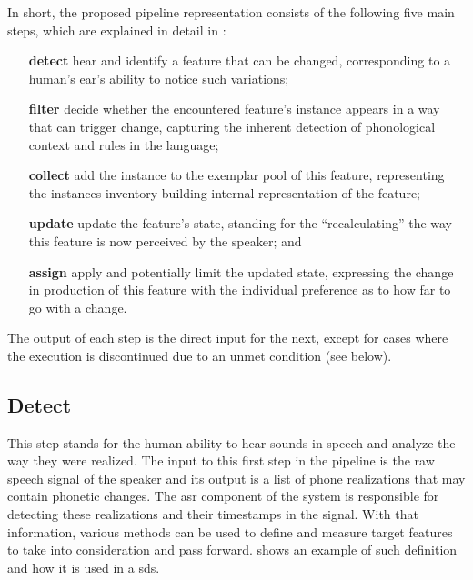 In short, the proposed pipeline representation consists of the following five main steps, which are explained in detail in :
%
\begin{itemize}[topsep=0cm, itemsep=-.1cm, wide=0cm, leftmargin=!, labelwidth=]
	\item[\textbf{detect}] hear and identify a feature that can be changed, corresponding to a human's ear's ability to notice such variations;
	
	\item[\textbf{filter}] decide whether the encountered feature's instance appears in a way that can trigger change, capturing the inherent detection of phonological context and rules in the language;
	
	\item[\textbf{collect}] add the instance to the exemplar pool of this feature, representing the instances inventory building internal representation of the feature;
	
	\item[\textbf{update}] update the feature's state, standing for the \enquote{recalculating} the way this feature is now perceived by the speaker; and
	
	\item[\textbf{assign}] apply and potentially limit the updated state, expressing the change in production of this feature with the individual preference as to how far to go with a change.
\end{itemize}
%
The output of each step is the direct input for the next, except for cases where the execution is discontinued due to an unmet condition (see below).

\subsection{Detect}
\label{subsec:detect}

This step stands for the human ability to hear sounds in speech and analyze the way they were realized.
The input to this first step in the pipeline is the raw speech signal of the speaker and its output is a list of phone realizations that may contain phonetic changes.
The \ac{asr} component of the system is responsible for detecting these realizations and their timestamps in the signal.
With that information, various methods can be used to define and measure target features to take into consideration and pass forward.
 shows an example of such definition and how it is used in a \ac{sds}.

